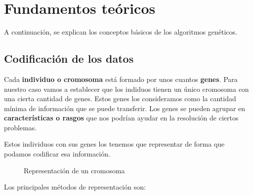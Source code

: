 \documentclass[
  a4paper,
  DIV=11,
  numbers=noendperiod]{scrreprt}
\begin{document}
\section{Fundamentos teóricos}\label{fundamentos-teuxf3ricos}

A continuación, se explican los conceptos básicos de los algoritmos
genéticos.

\subsection{Codificación de los
datos}\label{codificaciuxf3n-de-los-datos}

Cada \textbf{individuo o cromosoma} está formado por unos cuantos
\textbf{genes}. Para nuestro caso vamos a establecer que los indiduos
tienen un único cromosoma con una cierta cantidad de genes. Estos genes
los consideramos como la cantidad mínima de información que se puede
transferir. Los genes se pueden agrupar en \textbf{características o
rasgos} que nos podrían ayudar en la resolución de ciertos problemas.

Estos individuos con sus genes los tenemos que representar de forma que
podamos codificar esa información.

\begin{figure}


\caption{\label{fig-cromosoma}Representación de un cromosoma}

\end{figure}%

Los principales métodos de representación son:
\end{document}
